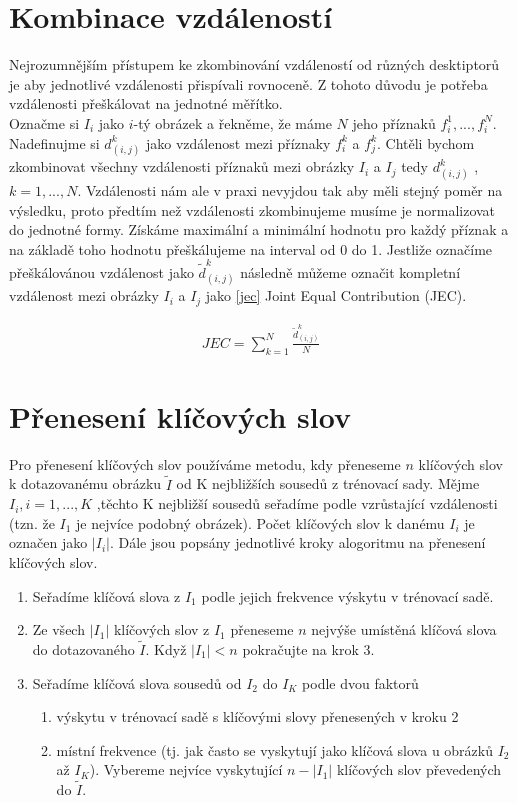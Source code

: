\documentclass[czech,BP]{thesiskiv}
\begin{document}
\section{Kombinace vzdáleností}
Nejrozumnějším přístupem ke zkombinování vzdáleností od různých desktiptorů je aby jednotlivé vzdálenosti přispívali rovnoceně. Z tohoto důvodu je potřeba vzdálenosti přeškálovat na jednotné měřítko.\\
Označme si $I_i$ jako $i$-tý obrázek a řekněme, že máme $N$ jeho příznaků $f_i^1, ..., f_i^N$. Nadefinujme si $d_{(i,j)}^k$ jako vzdálenost mezi příznaky $f_i^k$ a $f_j^k$. Chtěli bychom zkombinovat všechny vzdálenosti příznaků mezi obrázky $I_i$ a $I_j$ tedy $d_{(i,j)}^k$ , $k=1, ..., N$.  Vzdálenosti nám ale v praxi nevyjdou tak aby měli stejný poměr na výsledku, proto předtím než vzdálenosti zkombinujeme musíme je normalizovat do jednotné formy. Získáme maximální a minimální hodnotu pro každý příznak a na základě toho hodnotu přeškálujeme na interval od 0 do 1. Jestliže označíme přeškálovánou vzdálenost jako ${\tilde{d}_{(i,j)}^k}$ následně můžeme označit kompletní vzdálenost mezi obrázky $I_i$ a $I_j$ jako \eqref{jec} Joint Equal Contribution (JEC). 


\begin{align}
   \label{jec} JEC = \sum_{k=1}^N\frac{\tilde{d}_{(i,j)}^k}{N}
\end{align}

\section{Přenesení klíčových slov}
Pro přenesení klíčových slov používáme metodu, kdy přeneseme $n$ klíčových slov k dotazovanému obrázku $\tilde{I}$ od K nejbližších sousedů z trénovací sady. Mějme $I_{i}, i = 1, ..., K$ ,těchto K nejbližší sousedů seřadíme podle vzrůstající vzdálenosti (tzn. že $I_{1} $ je nejvíce podobný obrázek). Počet klíčových slov k danému $I_{i}$ je označen jako $|I_{i}|$. Dále jsou popsány jednotlivé kroky alogoritmu na přenesení klíčových slov.
\begin{enumerate}
	\item Seřadíme klíčová slova z $I_{1}$ podle jejich frekvence výskytu v trénovací sadě.
	\item Ze všech $|I_{1}|$ klíčových slov z $I_{1}$ přeneseme $n$ nejvýše umístěná klíčová slova do dotazovaného $\tilde{I}$. Když $|I_{1}| < n$ pokračujte na krok 3. 
	\item Seřadíme klíčová slova sousedů od $I_{2}$ do $I_{K}$ podle dvou faktorů
	\begin{enumerate}
		\item výskytu v trénovací sadě s klíčovými slovy přenesených v kroku 2
		\item místní frekvence (tj. jak často se vyskytují jako klíčová slova u obrázků $I_{2}$ až $I_{K}$). Vybereme nejvíce vyskytující $n-|I_{1}|$ klíčových slov převedených do $\tilde{I}$.
	\end{enumerate}
\end{enumerate}
\end{document}
